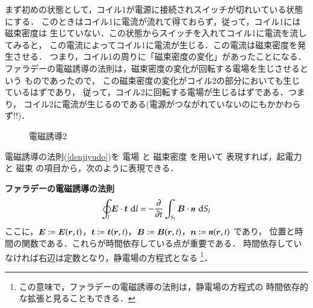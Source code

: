             まず初めの状態として，コイル1が電源に接続されスイッチが切れいている状態にする．
            このときはコイル1に電流が流れて得ておらず，従って，コイル1には磁束密度は
            生じていない．この状態からスイッチを入れてコイル1に電流を流してみると，
            この電流によってコイル1に電流が生じる．この電流は磁束密度を発生させる．
            つまり，コイル1の周りに「磁束密度の変化」があったことになる．
            ファラデーの電磁誘導の法則は，磁束密度の変化が回転する電場を生じさせるという
            ものであったので，
            この磁束密度の変化がコイル2の部分においても生じているはずであり，
            従って，コイル2に回転する電場が生じるはずである．つまり，
            コイル2に電流が生じるのである(電源がつながれていないのにもかかわらず!!)．
                \begin{figure}[hbt]
                    \begin{center}
                        \caption{電磁誘導2}
                        \label{fig:denjiyuudou2}
                    \end{center}
                \end{figure}

            電磁誘導の法則(\ref{denjiyudo})を 電場 と 磁束密度 を用いて
            表現すれば，起電力 と 磁束 の項目から，次のように表現できる．
                    \begin{myshadebox}\textbf{ファラデーの電磁誘導の法則}
                        \begin{align}
                        \oint_{l} \boldsymbol{E}\cdot\boldsymbol{t} \,\,\mathrm{d} l =-\frac{\partial}{\partial t}\int_{S_{l}} \boldsymbol{B} \cdot\textit{\textbf{n}} \,\,\mathrm{d} S_{l}
                        \end{align}
                        ここに，$\boldsymbol{E}:=\boldsymbol{E}(\boldsymbol{r},t)$，$\boldsymbol{t}:=\boldsymbol{t}(\boldsymbol{r},t)$，$\boldsymbol{B}:=\boldsymbol{B}(\boldsymbol{r},t)$，$\boldsymbol{n}:=\textit{\textbf{n}}(\boldsymbol{r},t)$ であり，
                        位置と時間の関数である．これらが時間依存している点が重要である．
                        時間依存していなければ右辺は定数となり，静電場の方程式となる
                            \footnote{
                                この意味で，ファラデーの電磁誘導の法則は，静電場の方程式の
                                時間依存的な拡張と見ることもできる．
                            }．
                    \end{myshadebox}

